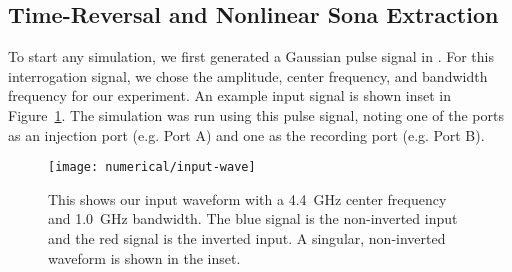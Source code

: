 \subsection{Time-Reversal and Nonlinear Sona Extraction}
To start any simulation, we first generated a Gaussian pulse signal in \matlab. For this interrogation signal, we chose the amplitude, center frequency, and bandwidth frequency for our experiment. An example input signal is shown inset in Figure~\ref{fig:numerical-input-wave}. The simulation was run using this pulse signal, noting one of the ports as an injection port (e.g. Port A) and one as the recording port (e.g. Port B).


\begin{figure}[t]
\centering
\texttt{[image: numerical/input-wave]}
\caption[Example of inverted and non-inverted interrogation signals]{This shows our input waveform with a 4.4~GHz center frequency and 1.0~GHz bandwidth. The blue signal is the non-inverted input and the red signal is the inverted input. A singular, non-inverted waveform is shown in the inset.}
\label{fig:numerical-input-wave}
\end{figure}

